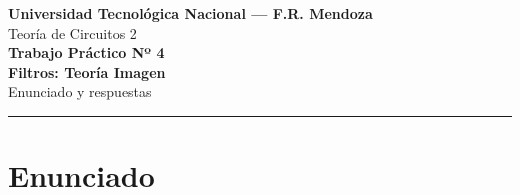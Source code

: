 \documentclass[class=article, crop=false, oneside]{standalone}
\begin{document}
\begin{center}
    {\Large\bfseries Universidad Tecnológica Nacional --- F.R. Mendoza}\\[2pt]
    {\large Teoría de Circuitos 2}\\[10pt]
    {\huge\bfseries\color{utnblue} Trabajo Práctico Nº 4}\\[4pt]
    {\LARGE\bfseries Filtros: Teoría Imagen}\\[10pt]
    {\large Enunciado y respuestas}\\[2pt]
\end{center}

\vspace{0.5ex}
\hrule
\vspace{1ex}

\section*{\color{utnblue}Enunciado}
\end{document}
